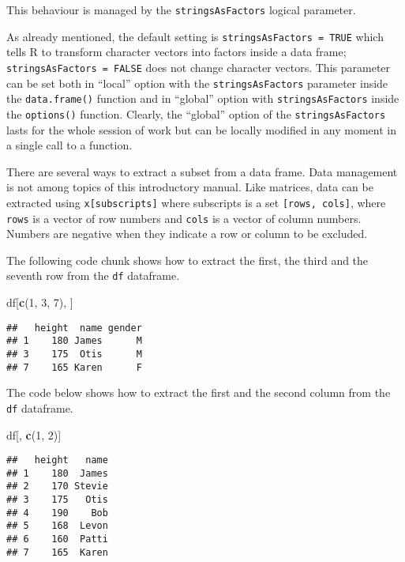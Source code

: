 \documentclass[]{book}
\newenvironment{Shaded}{\begin{snugshade}}{\end{snugshade}}
\newcommand{\KeywordTok}[1]{\textcolor[rgb]{0.13,0.29,0.53}{\textbf{{#1}}}}
\newcommand{\DecValTok}[1]{\textcolor[rgb]{0.00,0.00,0.81}{{#1}}}
\newcommand{\NormalTok}[1]{{#1}}
\begin{document}
This behaviour is managed by the \texttt{stringsAsFactors} logical
parameter.

As already mentioned, the default setting is
\texttt{stringsAsFactors\ =\ TRUE} which tells R to transform character
vectors into factors inside a data frame;
\texttt{stringsAsFactors\ =\ FALSE} does not change character vectors.
This parameter can be set both in ``local'' option with the
\texttt{stringsAsFactors} parameter inside the \texttt{data.frame()}
function and in ``global'' option with \texttt{stringsAsFactors} inside
the \texttt{options()} function. Clearly, the ``global'' option of the
\texttt{stringsAsFactors} lasts for the whole session of work but can be
locally modified in any moment in a single call to a function.

There are several ways to extract a subset from a data frame. Data
management is not among topics of this introductory manual. Like
matrices, data can be extracted using \texttt{x{[}subscripts{]}} where
subscripts is a set \texttt{{[}rows,\ cols{]}}, where \texttt{rows} is a
vector of row numbers and \texttt{cols} is a vector of column numbers.
Numbers are negative when they indicate a row or column to be excluded.

The following code chunk shows how to extract the first, the third and
the seventh row from the \texttt{df} dataframe.

\begin{Shaded}
\begin{Highlighting}[]
\NormalTok{df[}\KeywordTok{c}\NormalTok{(}\DecValTok{1}\NormalTok{, }\DecValTok{3}\NormalTok{, }\DecValTok{7}\NormalTok{), ]}
\end{Highlighting}
\end{Shaded}

\begin{verbatim}
##   height  name gender
## 1    180 James      M
## 3    175  Otis      M
## 7    165 Karen      F
\end{verbatim}

The code below shows how to extract the first and the second column from
the \texttt{df} dataframe.

\begin{Shaded}
\begin{Highlighting}[]
\NormalTok{df[, }\KeywordTok{c}\NormalTok{(}\DecValTok{1}\NormalTok{, }\DecValTok{2}\NormalTok{)]}
\end{Highlighting}
\end{Shaded}

\begin{verbatim}
##   height   name
## 1    180  James
## 2    170 Stevie
## 3    175   Otis
## 4    190    Bob
## 5    168  Levon
## 6    160  Patti
## 7    165  Karen
\end{verbatim}
\end{document}
